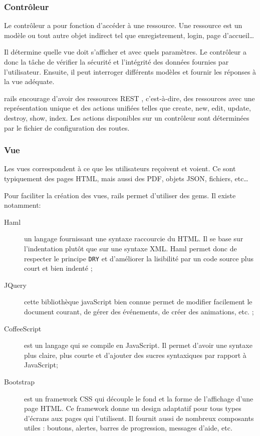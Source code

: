 \subsubsection{Contrôleur}
\label{controleur}
Le contrôleur a pour fonction d'accéder à une ressource. Une ressource est un modèle ou tout autre objet indirect tel que enregistrement, login, page d'accueil\ldots

Il détermine quelle vue doit s'afficher et avec quels paramètres. Le contrôleur a donc la tâche de vérifier la sécurité et l'intégrité des données fournies par l'utilisateur. Ensuite, il peut interroger différents modèles et fournir les réponses à la vue adéquate.

\label{rest}\label{rails-routes}
\gls{rails} encourage d'avoir des ressources REST \cite{wiki-rest}, c'est-à-dire, des ressources avec une représentation unique et des actions unifiées telles que create, new, edit, update, destroy, show, index. Les actions disponibles sur un contrôleur sont déterminées par le fichier de configuration des routes.

\subsubsection{Vue}
Les vues correspondent à ce que les utilisateurs reçoivent et voient. Ce sont typiquement des pages HTML, mais aussi des PDF, objets JSON, fichiers, etc\ldots

Pour faciliter la création des vues, \gls{rails} permet d'utiliser des \glspl{gem}. Il existe notamment:
\begin{description}
  \item[Haml \cite{haml} \label{haml}] un langage fournissant une syntaxe raccourcie du HTML. Il se base sur l'indentation plutôt que sur une syntaxe XML. Haml permet donc de respecter le principe \texttt{DRY} et d'améliorer la lisibilité par un code source plus court et bien indenté ;
  \item[JQuery \cite{jquery}] cette bibliothèque javaScript bien connue permet de modifier facilement le document courant, de gérer des événements, de créer des animations, etc. ;
  \item[CoffeeScript \cite{coffeescript}] est un langage qui se compile en JavaScript. Il permet d'avoir une syntaxe plus claire, plus courte et d'ajouter des sucres syntaxiques par rapport à JavaScript;
  \item[Bootstrap \cite{bootstrap}] est un framework CSS qui découple le fond et la forme de l'affichage d'une page HTML. Ce framework donne un design adaptatif pour tous types d'écrans aux pages qui l'utilisent. Il fournit aussi de nombreux composants utiles : boutons, alertes, barres de progression, messages d'aide, etc. \label{bootstrap}
\end{description}
